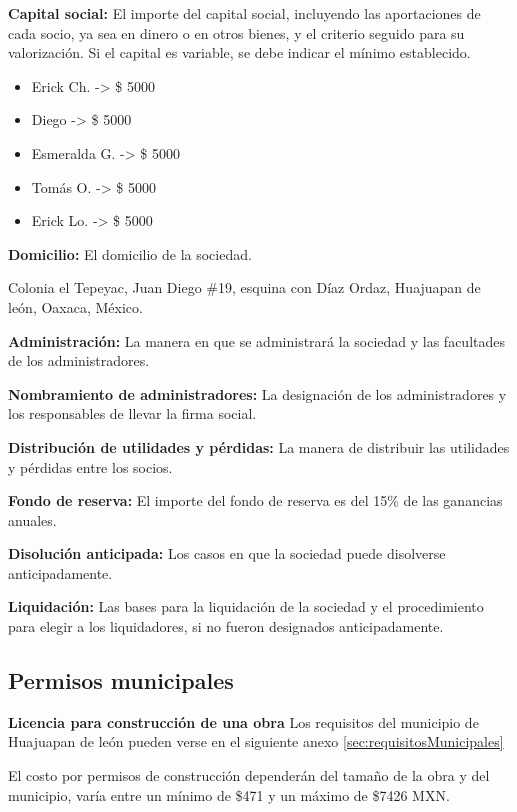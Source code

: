 \textbf{Capital social:}
El importe del capital social, incluyendo las aportaciones de cada socio, ya sea en dinero o en otros bienes, y el criterio seguido para su valorización. Si el capital es variable, se debe indicar el mínimo establecido.

\begin{itemize}
    \item Erick Ch. -> \$ 5000
    \item Diego -> \$ 5000
    \item Esmeralda G. -> \$ 5000
    \item Tomás O. -> \$ 5000
    \item Erick Lo. -> \$ 5000
\end{itemize}

\textbf{Domicilio:}
El domicilio de la sociedad.

Colonia el Tepeyac, Juan Diego \#19, esquina con Díaz Ordaz, Huajuapan de león, Oaxaca, México.

\textbf{Administración:}
La manera en que se administrará la sociedad y las facultades de los administradores.

\textbf{Nombramiento de administradores:}
La designación de los administradores y los responsables de llevar la firma social.

\textbf{Distribución de utilidades y pérdidas:}
La manera de distribuir las utilidades y pérdidas entre los socios.

\textbf{Fondo de reserva:}
El importe del fondo de reserva es del 15\% de las ganancias anuales.

\textbf{Disolución anticipada:}
Los casos en que la sociedad puede disolverse anticipadamente.

\textbf{Liquidación:}
Las bases para la liquidación de la sociedad y el procedimiento para elegir a los liquidadores, si no fueron designados anticipadamente.

\subsection{Permisos municipales}
\label{sec:permisos}
\textbf{Licencia para construcción de una obra}
Los requisitos del municipio de Huajuapan de león pueden verse en el siguiente anexo \ref{sec:requisitosMunicipales}

El costo por permisos de construcción dependerán del tamaño de la obra y del municipio, varía entre un mínimo de \$471 y un máximo de \$7426 MXN. \cite{permisos2024Mexico}

